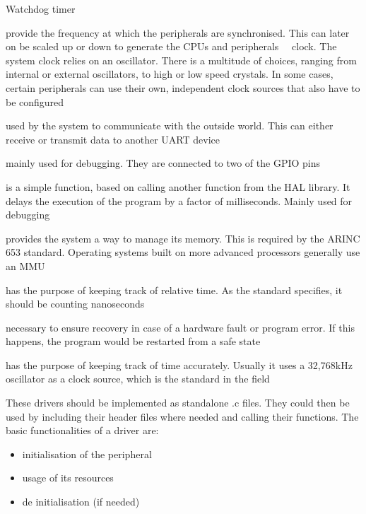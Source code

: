 \begin{labeling}{Watchdog timer}
	\item [\textbf{System Clock}] provide the frequency at which the
	peripherals are synchronised. This can later on be scaled up or down
	to generate the CPU\textquotesingle s and peripherals\textquotesingle
	\ \ clock.
	The system clock relies on an oscillator.
	There is a multitude of choices, ranging from internal or external
	oscillators, to high or low speed crystals. In some cases, certain
	peripherals can use their own, independent clock sources that also have
	to be configured
	\item [\textbf{UART}] used by the system to communicate with the outside
	world. This can either receive or transmit data to another UART device
	\item [\textbf{LEDs}] mainly used for debugging. They are
	connected to two of the GPIO pins
	\item [\textbf{Delay}] is a simple function, based on calling another
	function from the HAL library. It delays the execution 
	of the program by a factor of milliseconds. Mainly used for debugging
	\item [\textbf{MPU}] provides the system a way to manage its
	memory. This is required by the ARINC 653 standard. 
	Operating systems built on more advanced processors generally use 
	an MMU
	\item [\textbf{Timing}] has the purpose of keeping track of 
	relative time. As the standard specifies, it should be counting 
	nanoseconds
	\item [\textbf{Watchdog timer}] necessary to ensure recovery
	in case of a hardware fault or program error. If this happens, the
	program would be restarted from a safe state
	\item [\textbf{RTC}] has the purpose of keeping track of 
	time accurately. Usually it uses  a 32,768kHz oscillator as a 
	clock source, which is the standard in the field
	
\end{labeling}

These drivers should be implemented as standalone .c files. They could then
be used by including their header files where needed and calling their
functions.
The basic functionalities of a driver are:
\begin{itemize}[noitemsep]
	\item initialisation of the peripheral
	\item usage of its resources
	\item de initialisation (if needed) 
\end{itemize}

